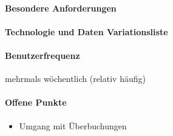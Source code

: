 \paragraph{Besondere Anforderungen}

\paragraph{Technologie und Daten Variationsliste}

\paragraph{Benutzerfrequenz}
mehrmals wöchentlich (relativ häufig)

\paragraph{Offene Punkte}
\begin{itemize}
	\item Umgang mit Überbuchungen
\end{itemize}

\newpage

